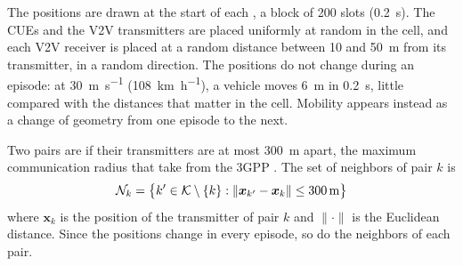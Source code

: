 The positions are drawn at the start of each , a block of 200 slots (\SI{0.2}{\second}).
The \acp{CUE} and the \ac{V2V} transmitters are placed uniformly at random in the cell, and each \ac{V2V}
receiver is placed at a random distance between 10 and \SI{50}{\meter} from its transmitter, in a random
direction. The positions do not change during an episode: at \SI{30}{\meter\per\second}
(\SI{108}{\kilo\meter\per\hour}), a vehicle moves \SI{6}{\meter} in \SI{0.2}{\second}, little compared with
the distances that matter in the cell. Mobility appears instead as a change of geometry from one episode to
the next.

Two pairs are  if their transmitters are at most \SI{300}{\meter} apart, the maximum
communication radius that \citet{li+22fedmarl} take from the \ac{3GPP} \cite{3gpp16v2x}. The set of
neighbors of pair $k$ is
\begin{equation}
  \mathcal{N}_k = \bigl\{ k' \in \mathcal{K} \setminus \{k\} : \lVert \bm{x}_{k'} - \bm{x}_k \rVert \le \SI{300}{\meter} \bigr\}
  \label{eq:sm-neighbors}
\end{equation}
where $\bm{x}_k$ is the position of the transmitter of pair $k$ and $\lVert\cdot\rVert$ is the Euclidean
distance. Since the positions change in every episode, so do the neighbors of each pair.

